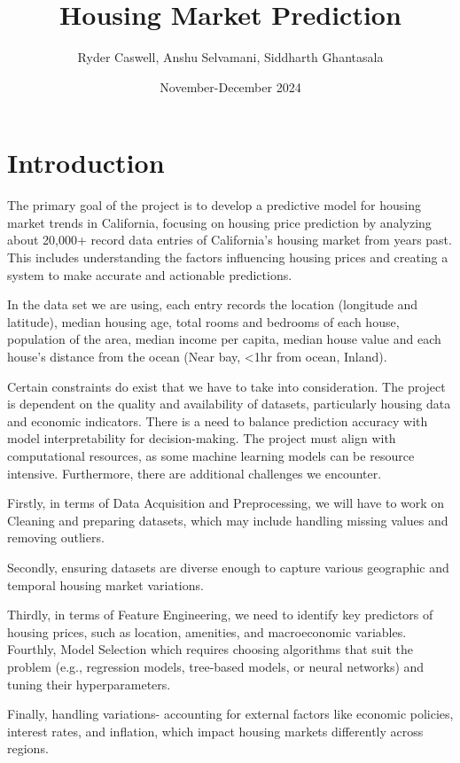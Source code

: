 \documentclass{article}
\title{\textbf{Housing Market Prediction}}
\author{Ryder Caswell, Anshu Selvamani, Siddharth Ghantasala}
\date{November-December 2024}
\begin{document}
\maketitle

\section{Introduction}
The primary goal of the project is to develop a predictive model for housing market trends in California, focusing on housing price prediction by analyzing about 20,000+ record data entries of California’s housing market from years past. This includes understanding the factors influencing housing prices and creating a system to make accurate and actionable predictions. 

In the data set we are using, each entry records the location (longitude and latitude), median housing age, total rooms and bedrooms of each house, population of the area, median income per capita, median house value and each house’s distance from the ocean (Near bay, <1hr from ocean, Inland). 

Certain constraints do exist that we have to take into consideration. The project is dependent on the quality and availability of datasets, particularly housing data and economic indicators. There is a need to balance prediction accuracy with model interpretability for decision-making. The project must align with computational resources, as some machine learning models can be resource intensive.  Furthermore, there are additional challenges we encounter. 

Firstly, in terms of Data Acquisition and Preprocessing, we will have to work on Cleaning and preparing datasets, which may include handling missing values and removing outliers. 

Secondly, ensuring datasets are diverse enough to capture various geographic and temporal housing market variations. 

Thirdly, in terms of Feature Engineering, we need to identify key predictors of housing prices, such as location, amenities, and macroeconomic variables. Fourthly, Model Selection which requires choosing algorithms that suit the problem (e.g., regression models, tree-based models, or neural networks) and tuning their hyperparameters.  

Finally, handling variations- accounting for external factors like economic policies, interest rates, and inflation, which impact housing markets differently across regions.
\end{document}
